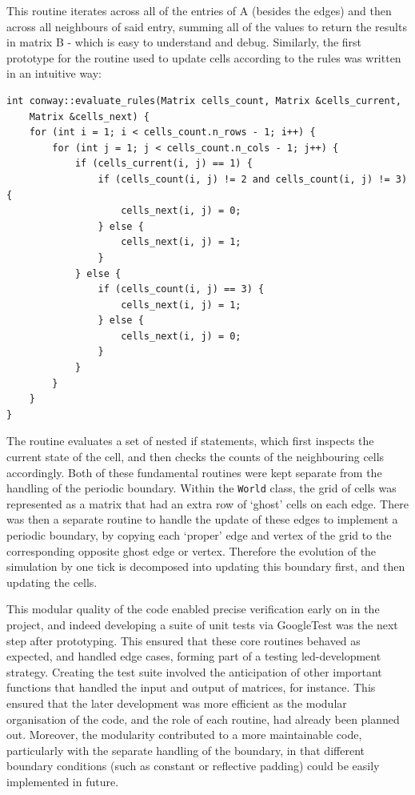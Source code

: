 \documentclass[12pt]{article}
\begin{document}
This routine iterates across all of the entries of A (besides the edges) and then across all neighbours of said entry,
summing all of the values to return the results in matrix B - which is easy to understand and debug.
Similarly, the first prototype for the routine used to update cells according to the rules was written in an intuitive way:

\begin{lstlisting}
int conway::evaluate_rules(Matrix cells_count, Matrix &cells_current,
    Matrix &cells_next) {
    for (int i = 1; i < cells_count.n_rows - 1; i++) {
        for (int j = 1; j < cells_count.n_cols - 1; j++) {
            if (cells_current(i, j) == 1) {
                if (cells_count(i, j) != 2 and cells_count(i, j) != 3) {
                    cells_next(i, j) = 0;
                } else {
                    cells_next(i, j) = 1;
                }
            } else {
                if (cells_count(i, j) == 3) {
                    cells_next(i, j) = 1;
                } else {
                    cells_next(i, j) = 0;
                }
            }
        }
    }
}
\end{lstlisting}

The routine evaluates a set of nested if statements,
which first inspects the current state of the cell, and then checks the counts of the neighbouring cells accordingly.
Both of these fundamental routines were kept separate from the handling of the periodic boundary.
Within the \texttt{World} class, the grid of cells was represented as a matrix that had an extra row of `ghost' cells on each edge.
There was then a separate routine to handle the update of these edges to implement a periodic boundary,
by copying each `proper' edge and vertex of the grid to the corresponding opposite ghost edge or vertex.
Therefore the evolution of the simulation by one tick is decomposed into updating this boundary first, and then updating the cells.

This modular quality of the code enabled precise verification early on in the project,
and indeed developing a suite of unit tests via GoogleTest was the next step after prototyping.
This ensured that these core routines behaved as expected, and handled edge cases, forming part of a testing led-development strategy.
Creating the test suite involved the anticipation of other important functions that handled the input and output of matrices, for instance.
This ensured that the later development was more efficient as the modular organisation of the code, and the role of each routine, had already been planned out.
Moreover, the modularity contributed to a more maintainable code, particularly with the separate handling of the boundary,
in that different boundary conditions (such as constant or reflective padding) could be easily implemented in future.
\end{document}
